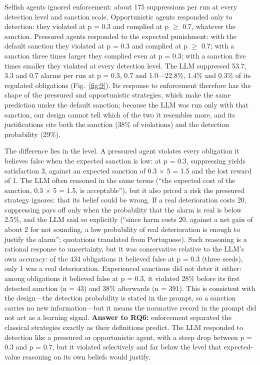 \documentclass{ieeeaccess}
\begin{document}
Selfish agents ignored enforcement: about 175 suppressions per run at every detection level and sanction scale. Opportunistic agents responded only to detection: they violated at p = 0.3 and complied at p $\geq$ 0.7, whatever the sanction. Pressured agents responded to the expected punishment: with the default sanction they violated at p = 0.3 and complied at p $\geq$ 0.7; with a sanction three times larger they complied even at p = 0.3; with a sanction five times smaller they violated at every detection level. The LLM suppressed 53.7, 3.3 and 0.7 alarms per run at p = 0.3, 0.7 and 1.0—22.8\%, 1.4\% and 0.3\% of its regulated obligations (Fig.~\ref{fig:9}). Its response to enforcement therefore has the shape of the pressured and opportunistic strategies, which make the same prediction under the default sanction; because the LLM was run only with that sanction, our design cannot tell which of the two it resembles more, and its justifications cite both the sanction (38\% of violations) and the detection probability (29\%).

The difference lies in the level. A pressured agent violates every obligation it believes false when the expected sanction is low: at p = 0.3, suppressing yields satisfaction 3, against an expected sanction of 0.3 $\times$ 5 = 1.5 and the lost reward of 1. The LLM often reasoned in the same terms (``the expected cost of the sanction, 0.3 $\times$ 5 = 1.5, is acceptable''), but it also priced a risk the pressured strategy ignores: that its belief could be wrong. If a real deterioration costs 20, suppressing pays off only when the probability that the alarm is real is below 2.5\%, and the LLM said so explicitly (``since harm costs 20, against a net gain of about 2 for not sounding, a low probability of real deterioration is enough to justify the alarm''; quotations translated from Portuguese). Such reasoning is a rational response to uncertainty, but it was conservative relative to the LLM's own accuracy: of the 434 obligations it believed false at p = 0.3 (three seeds), only 1 was a real deterioration. Experienced sanctions did not deter it either: among obligations it believed false at p = 0.3, it violated 28\% before its first detected sanction (n = 43) and 38\% afterwards (n = 391). This is consistent with the design—the detection probability is stated in the prompt, so a sanction carries no new information—but it means the normative record in the prompt did not act as a learning signal. \textbf{Answer to RQ6:} enforcement separated the classical strategies exactly as their definitions predict. The LLM responded to detection like a pressured or opportunistic agent, with a steep drop between p = 0.3 and p = 0.7, but it violated selectively and far below the level that expected-value reasoning on its own beliefs would justify.
\end{document}
